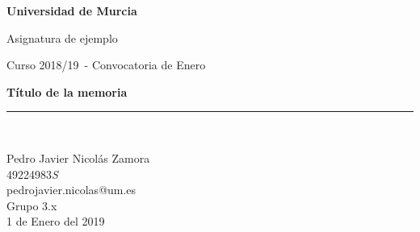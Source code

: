 \documentclass[a4paper,spanish,12pt]{report}
\title{\textitle}
\author{Pedro Javier Nicol\'as Zamora}
\newcommand{\textitle}{Título de la memoria}
\newcommand{\texsubject}{Asignatura de ejemplo}
\newcommand{\texyear}{2018/19}
\newcommand{\texmonth}{Enero}
\newcommand{\texdate}{1 de Enero del 2019}
\newcommand{\texgroup}{Grupo 3.x}
\begin{document}

  \begin{titlepage}
  \begin{center}
  \begin{figure}[htb]
  \end{figure}
  \begin{Huge}
  \textbf{Universidad de Murcia}\\
  \end{Huge}
  \begin{huge}
  \vspace{0.1cm}
  \texsubject \\
  \end{huge}
  \begin{LARGE}
  Curso \texyear\ - Convocatoria de \texmonth \\
  \end{LARGE}
  \vspace*{2cm}
  \begin{Huge}
  \textbf{\textitle} \\
  \end{Huge}
  \vspace*{10cm}
  \rule{80mm}{0.1mm}\\
  \vspace*{0.5cm}
  \begin{Large}

  Pedro Javier Nicolás Zamora\\
  49224983\textit{S}\ \ \ \ \\
  pedrojavier.nicolas@um.es\\

  \vspace*{0.5cm}
  \texgroup \\
  \texdate \\
  \end{Large}
  \end{center}
  \end{titlepage}

  \setcounter{page}{2}

  \tableofcontents
  \pagebreak

\end{document}
